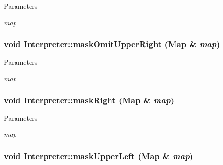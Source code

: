 \begin{DoxyParams}{Parameters}
\item[{\em map}]\end{DoxyParams}
\hypertarget{classInterpreter_a83c078f3465a96026dbbc1ef3d7d120b}{
\subsubsection[{maskOmitUpperRight}]{\setlength{\rightskip}{0pt plus 5cm}void Interpreter::maskOmitUpperRight ({\bf Map} \& {\em map})}}
\label{classInterpreter_a83c078f3465a96026dbbc1ef3d7d120b}

\begin{DoxyParams}{Parameters}
\item[{\em map}]\end{DoxyParams}
\hypertarget{classInterpreter_abdfaacb7134b907d16a412ec1f80364b}{
\subsubsection[{maskRight}]{\setlength{\rightskip}{0pt plus 5cm}void Interpreter::maskRight ({\bf Map} \& {\em map})}}
\label{classInterpreter_abdfaacb7134b907d16a412ec1f80364b}

\begin{DoxyParams}{Parameters}
\item[{\em map}]\end{DoxyParams}
\hypertarget{classInterpreter_a1892fcf6bef01aa68c015c5a4a0c5f96}{
\subsubsection[{maskUpperLeft}]{\setlength{\rightskip}{0pt plus 5cm}void Interpreter::maskUpperLeft ({\bf Map} \& {\em map})}}
\label{classInterpreter_a1892fcf6bef01aa68c015c5a4a0c5f96}

